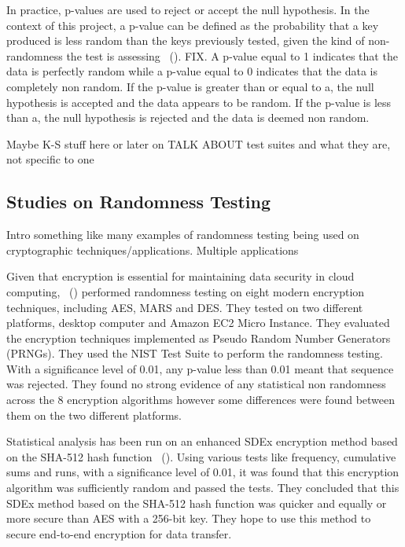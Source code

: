 In practice, p-values are used to reject or accept the null hypothesis. In the context of this project, a p-value can be defined as the probability that a key produced is less random than the keys previously tested, given the kind of non-randomness the test is assessing ~(\cite{1195701}). FIX. A p-value equal to 1 indicates that the data is perfectly random while a p-value equal to 0 indicates that the data is completely non random. If the p-value is greater than or equal to a, the null hypothesis is accepted and the data appears to be random. If the p-value is less than a, the null hypothesis is rejected and the data is deemed non random. \newline

Maybe K-S stuff here or later on
TALK ABOUT test suites and what they are, not specific to one

\subsection{Studies on Randomness Testing}
Intro something like many examples of randomness testing being used on cryptographic techniques/applications. Multiple applications \newline

Given that encryption is essential for maintaining data security in cloud computing, ~(\cite{6236554}) performed randomness testing on eight modern encryption techniques, including AES, MARS and DES. They tested on two different platforms, desktop computer and Amazon EC2 Micro Instance. They evaluated the encryption techniques implemented as Pseudo Random Number Generators (PRNGs). They used the NIST Test Suite to perform the randomness testing. With a significance level of 0.01, any p-value less than 0.01 meant that sequence was rejected. They found no strong evidence of any statistical non randomness across the 8 encryption algorithms however some differences were found between them on the two different platforms. \newline

Statistical analysis has been run on an enhanced SDEx encryption method based on the SHA-512 hash function ~(\cite{9209663}). Using various tests like frequency, cumulative sums and runs, with a significance level of 0.01, it was found that this encryption algorithm was sufficiently random and passed the tests. They concluded that this SDEx method based on the SHA-512 hash function was quicker and equally or more secure than AES with a 256-bit key. They hope to use this method to secure end-to-end encryption for data transfer.\newline

